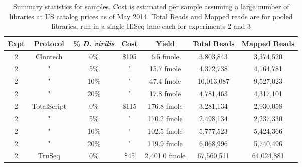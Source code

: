 

\begin{table}[htdp]

\caption{Summary statistics for samples. Cost is estimated per sample assuming a
     large number of libraries at US catalog prices as of May 2014. Total Reads
     and Mapped reads are for pooled libraries, run in a single HiSeq lane each
     for experiments 2 and 3}
\begin{center}
\begin{tabular}{|c|c|c|c|c|c|c|} \hline
      Expt & Protocol & \% {\em D. virilis} & Cost &  Yield & Total Reads & Mapped Reads \\\hline 
2 & Clontech & 0\% & \$105 & 6.5 fmole & 3,803,843 &3,374,520 \\
2 & " & 5\% & " & 15.7 fmole & 4,372,738 &4,164,781 \\
2 & " & 10\% & " & 47.4 fmole & 10,013,087 &9,527,023 \\
2 & " & 20\% & " & 17.8 fmole & 4,781,463 &4,317,101 \\
2 & TotalScript & 0\% & \$115 & 176.8 fmole & 3,281,134 &2,930,058 \\
2 & " & 5\% & " & 170.2 fmole & 2,498,134 &2,237,330 \\
2 & " & 10\% & " & 102.5 fmole & 5,777,523 &5,424,366 \\
2 & " & 20\% & " & 119.9 fmole & 6,068,996 &5,740,496 \\
2 & TruSeq & 0\% & \$45 & 2,401.0 fmole & 67,560,511 &64,024,881 \\

\end{tabular}
\end{center}
\end{table}
